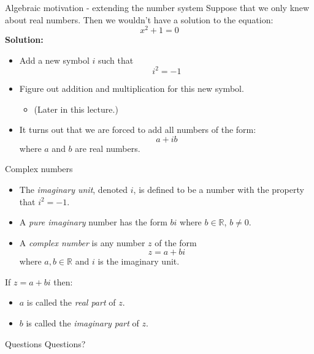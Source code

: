 \documentclass{beamer}
\begin{document}
\begin{frame}{Algebraic motivation - extending the number system}
Suppose that we only knew about real numbers.\vfill
Then we wouldn't have a solution to the equation:
\begin{equation*}
 x^2 + 1 = 0
\end{equation*}
{\bf Solution:}
\begin{itemize}
	\item Add a new symbol $i$ such that
	\begin{equation*}
	i^2 = -1
	\end{equation*}
	\item Figure out addition and multiplication for this new symbol.
	\begin{itemize}
		\item (Later in this lecture.)
	\end{itemize}
	\item It turns out that we are forced to add all numbers of the form:
	\begin{equation*}
	a+ib
	\end{equation*}
	where $a$ and $b$ are real numbers.
\end{itemize}
\end{frame}

\begin{frame}{Complex numbers}
\begin{definition}
\begin{itemize}
\item
The \emph{imaginary unit}, denoted $i$, is defined to be
a number with the property that $i^2=-1$.
\item
A \emph{pure imaginary} number has the form $bi$ where 
$b\in \mathbb{R}$, $b\neq 0$.
\item
A \emph{complex number} is any number $z$ of the form
\[ z = a + bi\]
where $a,b\in \mathbb{R}$ and $i$ is the imaginary unit.
\end{itemize}
\end{definition}
\begin{definition}
If $z = a + bi$ then:
\begin{itemize}
\item
$a$ is called the \emph{real part} of $z$.
\item
$b$ is called the \emph{imaginary part} of $z$.
\end{itemize}
\end{definition}
\end{frame}

\begin{frame}{Questions}
Questions?
\end{frame}
\end{document}
